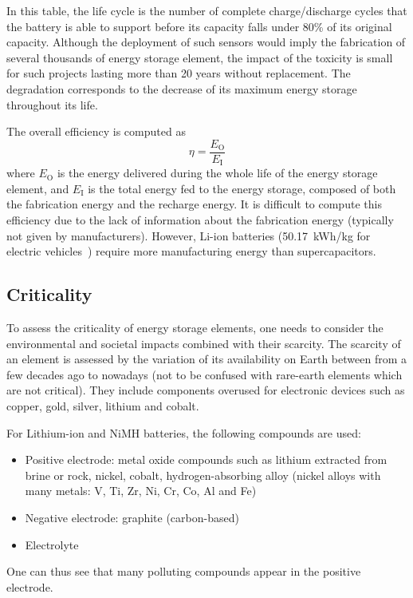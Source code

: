 \documentclass{EPL-master-thesis-covers-EN}
\newcommand{\te}[1]{\textrm{#1}}
\begin{document}
In this table, the life cycle is the number of complete charge/discharge cycles that the battery is able to support before its capacity falls under 80\% of its original capacity.
Although the deployment of such sensors would imply the fabrication of several thousands of energy storage element, the impact of the toxicity is small for such projects lasting more than 20 years without replacement. The degradation corresponds to the decrease of its maximum energy storage throughout its life.

The overall efficiency is computed as
\[
 \eta = \frac{E_\te{O}}{E_\te{I}}
\]
where $E_\te{O}$ is the energy delivered during the whole life of the energy storage element, and $E_\te{I}$ is the total energy fed to the energy storage, composed of both the fabrication energy and the recharge energy. It is difficult to compute this efficiency due to the lack of information about the fabrication energy (typically not given by manufacturers). However, Li-ion batteries (\SI{50.17}{kWh/kg} for electric vehicles~\cite{manufacturing_lithium}) require more manufacturing energy than supercapacitors.


\subsection*{Criticality}

To assess the criticality of energy storage elements, one needs to consider the environmental and societal impacts combined with their scarcity. The scarcity of an element is assessed by the variation of its availability on Earth between from a few decades ago to nowadays (not to be confused with rare-earth elements which are not critical). They include components overused for electronic devices such as copper, gold, silver, lithium and cobalt.

For Lithium-ion and NiMH batteries, the following compounds are used:
\begin{itemize}
 \item Positive electrode: metal oxide compounds such as lithium extracted from brine or rock, nickel, cobalt, hydrogen-absorbing alloy (nickel alloys with many metals: V, Ti, Zr, Ni, Cr, Co, Al and Fe)
 \item Negative electrode: graphite (carbon-based)
 \item Electrolyte
\end{itemize}

One can thus see that many polluting compounds appear in the positive electrode.
\end{document}
